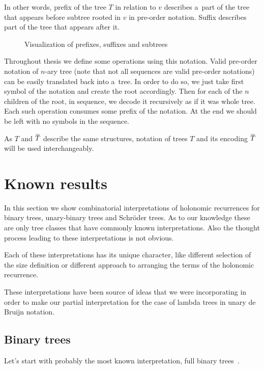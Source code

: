 \documentclass[final]{article}
\theoremstyle{definition}
\theoremstyle{definition}
\theoremstyle{remark}
\newcommand{\ols}[1]{\mskip.5\thinmuskip\overline{\mskip-.5\thinmuskip {#1} \mskip-.5\thinmuskip}\mskip.5\thinmuskip} %
\newcommand{\enc}[1]{\ensuremath{\ols{#1}}}
\begin{document}
In other words, prefix of the tree \(T\) in relation to \(v\) describes a~part of the tree that appears before subtree rooted in \(v\) in pre-order notation. Suffix describes part of the tree that appears after it.

\begin{figure}[H]
    \centering
    
    \caption{Visualization of prefixes, suffixes and subtrees}%
    \label{fig:presuf}
\end{figure}

Throughout thesis we define some operations using this notation. Valid pre-order notation of \(n\)-ary tree (note that not all sequences are valid pre-order notations) can be easily translated back into a~tree. In order to do so, we just take first symbol of the notation and create the root accordingly. Then for each of the \(n\) children of the root, in sequence, we decode it recursively as if it was whole tree. Each such operation consumes some prefix of the notation. At the end we should be left with no symbols in the sequence.

As \(T\) and \(\enc{T}\) describe the same structures, notation of trees \(T\) and its encoding \(\enc{T}\) will be used interchangeably.

\section{Known results}%
\label{sec:known_results}

In this section we show combinatorial interpretations of holonomic recurrences for binary trees, unary-binary trees and Schröder trees. As to our knowledge these are only tree classes that have commonly known interpretations. Also the thought process leading to these interpretations is not obvious.

Each of these interpretations has its unique character, like different selection of the size definition or different approach to arranging the terms of the holonomic recurrence.

These interpretations have been source of ideas that we were incorporating in order to make our partial interpretation for the case of lambda trees in unary de Bruijn notation.

\subsection{Binary trees}%
\label{sub:binary_trees}

Let's start with probably the most known interpretation, full binary trees~\cite{binary}.
\end{document}
